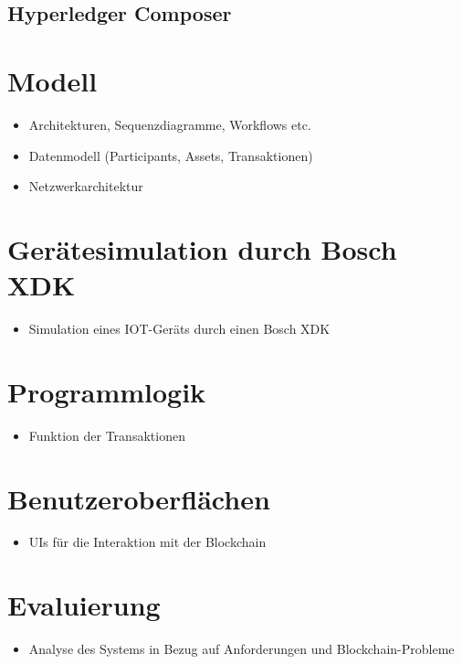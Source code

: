 \subsection{Hyperledger Composer}

\section{Modell}
\begin{itemize}
    \item Architekturen, Sequenzdiagramme, Workflows etc.
    \item Datenmodell (Participants, Assets, Transaktionen)
    \item Netzwerkarchitektur
\end{itemize}

\section{Gerätesimulation durch Bosch XDK}
\begin{itemize}
    \item Simulation eines IOT-Geräts durch einen Bosch XDK
\end{itemize}

\section{Programmlogik}
\begin{itemize}
    \item Funktion der Transaktionen
\end{itemize}

\section{Benutzeroberflächen}
\begin{itemize}
    \item UIs für die Interaktion mit der Blockchain
\end{itemize}


\section{Evaluierung}
\begin{itemize}
    \item Analyse des Systems in Bezug auf Anforderungen und Blockchain-Probleme
\end{itemize}



